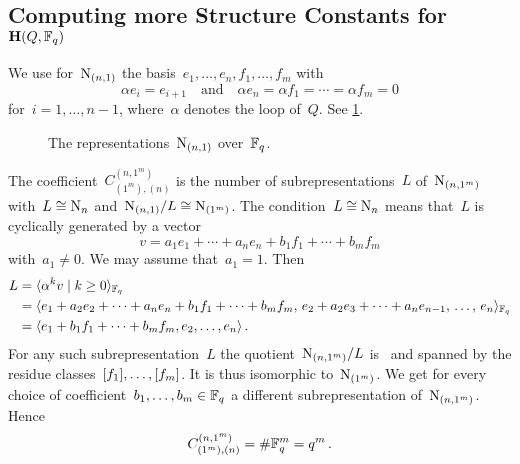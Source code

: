 \documentclass[a4paper,11pt]{scrartcl}
\begin{document}
\subsection{Computing more Structure Constants for~$\mathbf{H}(Q, \mathbb{F}_q)$}
\label{computing more structure constants}

We use for~$\mathrm{N}_{(n,1)}$ the basis~$e_1, \dotsc, e_n, f_1, \dotsc, f_m$ with
\[
  \alpha e_i = e_{i+1}
  \quad\text{and}\quad
  \alpha e_n = \alpha f_1 = \dotsb = \alpha f_m = 0
\]
for~$i = 1, \dotsc, n-1$, where~$\alpha$ denotes the loop of~$Q$.
See \cref{basis for n 1}.
\begin{figure}[tb]
  \centering
    \caption{The representations~$\mathrm{N}_{(n,1)}$ over~$\mathbb{F}_q$.}
  \label{basis for n 1}
\end{figure}

The coefficient~$C^{(n, 1^m)}_{(1^m), (n)}$ is the number of subrepresentations~$L$ of~$\mathrm{N}_{(n, 1^m)}$ with~$L \cong \mathrm{N}_n$ and~$\mathrm{N}_{(n,1)} / L \cong \mathrm{N}_{(1^m)}$.
The condition~$L \cong \mathrm{N}_n$ means that~$L$ is cyclically generated by a vector
\[
  v
  =
  a_1 e_1 + \dotsb + a_n e_n
  + b_1 f_1 + \dotsb + b_m f_m
\]
with~$a_1 \neq 0$.
We may assume that~$a_1 = 1$.
Then
\begin{align*}
  L
  &=
  \gen{ \alpha^k v \suchthat k \geq 0 }_{\Finite_q}
  \\
  &=
  \gen{
    e_1 + a_2 e_2 + \dotsb + a_n e_n
    + b_1 f_1 + \dotsb + b_m f_m,
    \,
    e_2 + a_2 e_3 + \dotsb + a_n e_{n-1},
    \,
    \dotsc,
    \,
    e_n
  }_{\Finite_q}
  \\
  &=
  \gen{ e_1 + b_1 f_1 + \dotsb + b_m f_m, e_2, \dotsc, e_n } \,.
\end{align*}
For any such subrepresentation~$L$ the quotient~$\mathrm{N}_{(n, 1^m)} / L$ is~ and spanned by the residue classes~$[f_1], \dotsc, [f_m]$.
It is thus isomorphic to~$\mathrm{N}_{(1^m)}$.
We get for every choice of coefficient~$b_1, \dotsc, b_m \in \mathbb{F}_q$ a different subrepresentation of~$\mathrm{N}_{(n, 1^m)}$.
Hence
\[
  C^{(n, 1^m)}_{(1^m), (n)}
  =
  \# \mathbb{F}_q^m
  =
  q^m \,.
\]
\end{document}
